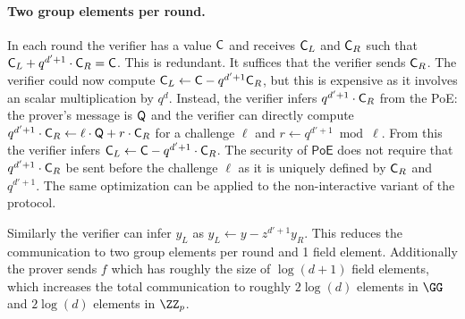 
\paragraph{Two group elements per round.} In each round the verifier has a value $\gr{C}$ and receives $\gr{C}_L$ and $\gr{C}_R$ such that $\gr{C}_L+q^{d'+1}\cdot \gr{C}_R=\gr{C}$. This is redundant. It suffices that the verifier sends $\gr{C}_R$. The verifier could now compute $\gr{C}_L\gets \gr{C} -q^{d'+1} \gr{C}_R$, but this is expensive as it involves an scalar multiplication by $q^d$. Instead, the verifier infers $q^{d'+1}\cdot \gr{C}_R$ from the \textsf{PoE}: the prover's message is $\gr{Q}$ and the verifier can directly compute $q^{d'+1}\cdot \gr{C}_R\gets \ell \cdot \gr{Q}+r\cdot \gr{C}_R$ for a challenge $\ell$ and $r\gets q^{d'+1} \bmod \ell$. From this the verifier infers $\gr{C}_L \gets \gr{C}-q^{d'+1} \cdot \gr{C}_R$. The security of $\textsf{PoE}$ does not require that $q^{d'+1}\cdot \gr{C}_R$ be sent before the challenge $\ell$ as it is uniquely defined by $\gr{C}_R$ and $q^{d'+1}$.
The same optimization can be applied to the non-interactive variant of the protocol. 

Similarly the verifier can infer $y_L$ as $y_L\gets y-z^{d'+1} y_R$. This reduces the communication to two group elements per round and 1 field element. Additionally the prover sends $f$ which has roughly the size of $\log(d+1)$ field elements, which increases the total communication to roughly $2\log(d)$ elements in $\GG$ and $2\log(d)$ elements in $\ZZ_p$. 

